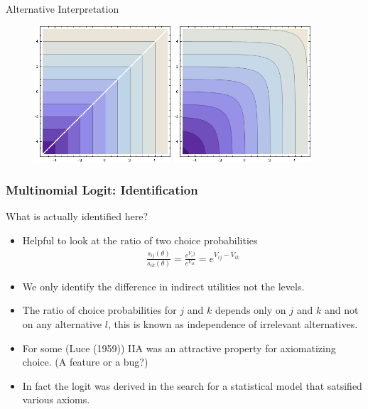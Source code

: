 \documentclass[xcolor=pdftex,dvipsnames,table,mathserif,aspectratio=169]{beamer}
\begin{document}
\begin{frame}{Alternative Interpretation}
\begin{figure}[htbp]
\begin{center}
\includegraphics[width=2in]{./resources/hardmax.png}
\includegraphics[width=2in]{./resources/softmax.png}
\end{center}
\end{figure}
\end{frame}

\begin{frame}
\frametitle{Multinomial Logit: Identification}
What is actually identified here?
\begin{itemize}
\item Helpful to look at the ratio of two choice probabilities
\begin{align*}
\frac{s_{ij}(\theta)}{s_{ik}(\theta)}  = \frac{e^{V_ij}}{e^{V_{ik}}} = e^{V_{ij} - V_{ik}}
\end{align*}
\item We only identify the \alert{difference in indirect utilities} not the levels.
\item The ratio of choice probabilities for $j$ and $k$ depends only on $j$ and $k$ and not on any alternative $l$, this is known as \alert{independence of irrelevant alternatives}.
\item For some (Luce (1959)) IIA was an attractive property for axiomatizing choice. (A feature or a bug?)
\item In fact the logit was derived in the search for a statistical model that satsified various axioms.
\end{itemize}
\end{frame}
\end{document}
